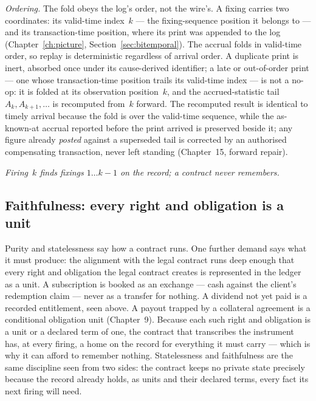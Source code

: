 \documentclass[11pt,a4paper]{article}
\begin{document}
\emph{Ordering.} The fold obeys the log's order, not the wire's. A fixing carries
two coordinates: its valid-time index~$k$ --- the fixing-sequence position it
belongs to --- and its transaction-time position, where its print was appended to
the log (Chapter~\ref{ch:picture}, Section~\ref{sec:bitemporal}). The accrual folds
in valid-time order, so replay is deterministic regardless of arrival order. A
duplicate print is inert, absorbed once under its cause-derived identifier; a late
or out-of-order print --- one whose transaction-time position trails its valid-time
index --- is not a no-op: it is folded at its observation position~$k$, and the
accrued-statistic tail $A_k, A_{k+1}, \ldots$ is recomputed from~$k$ forward. The
recomputed result is identical to timely arrival because the fold is over the
valid-time sequence, while the as-known-at accrual reported before the print
arrived is preserved beside it; any figure already \emph{posted} against a superseded tail
is corrected by an authorised compensating transaction, never left standing
(Chapter~15, forward repair).

\emph{Firing~$k$ finds fixings $1 \ldots k-1$ on the record; a contract never
remembers.}

\subsection{Faithfulness: every right and obligation is a unit}

Purity and statelessness say how a contract runs. One further demand says what it
must produce: the alignment with the legal contract runs deep enough that every
right and obligation the legal contract creates is represented in the ledger as
a unit. A subscription is booked as an exchange --- cash against the client's
redemption claim --- never as a transfer for nothing. A dividend not yet paid is
a recorded entitlement, seen above. A payout trapped by a collateral agreement
is a conditional obligation unit (Chapter~9). Because each such right and
obligation is a unit or a declared term of one, the contract that transcribes
the instrument has, at every firing, a home on the record for everything it must
carry --- which is why it can afford to remember nothing. Statelessness and
faithfulness are the same discipline seen from two sides: the contract keeps no
private state precisely because the record already holds, as units and their
declared terms, every fact its next firing will need.

\end{document}
